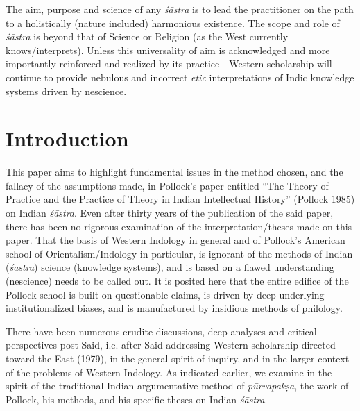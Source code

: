 The aim, purpose and science of any {\sl śāstra} is to lead the practitioner on the path to a holistically (nature included) harmonious existence. The scope and role of {\sl śāstra} is beyond that of Science or Religion (as the West currently knows/interprets). Unless this universality of aim is acknowledged and more importantly reinforced and realized by its practice - Western scholarship will continue to provide nebulous and incorrect {\sl etic} interpretations of Indic knowledge systems driven by nescience.

\section*{Introduction}
\vskip -10pt

This paper aims to highlight fundamental issues in the method chosen, and the fallacy of the assumptions made, in Pollock's paper entitled ``The Theory of Practice and the Practice of Theory in Indian Intellectual History'' (Pollock 1985) on Indian {\sl śāstra}. Even after thirty years of the publication of the said paper, there has been no rigorous examination of the interpretation/theses made on this paper. That the basis of Western Indology in general and of Pollock's American school of Orientalism/Indology in particular, is ignorant of the methods of Indian ({\sl śāstra}) science (knowledge systems), and is based on a flawed understanding (nescience) needs to be called out. It is posited here that the entire edifice of the Pollock school is built on questionable claims, is driven by deep underlying institutionalized biases, and is manufactured by insidious methods of philology. 

There have been numerous erudite discussions, deep analyses and critical perspectives post-Said, i.e. after Said  addressing Western scholarship directed toward the East (1979), in the general spirit of inquiry, and in the larger context of the problems of Western Indology. As indicated earlier, we examine in the spirit of the traditional Indian argumentative method of {\sl pūrvapakṣa}, the work of Pollock, his methods, and his specific theses on Indian {\sl śāstra}.  

